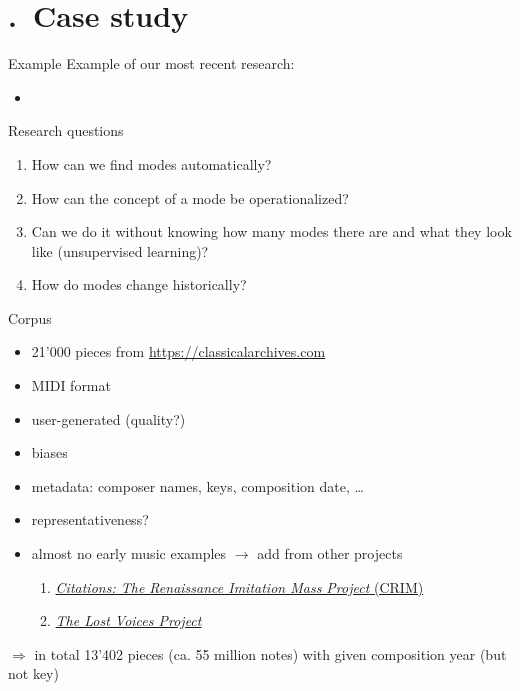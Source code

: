 \section{\thesection.~Case study}

\begin{frame}{Example}
    Example of our most recent research:
    \begin{itemize}
        \item {}
    \end{itemize}
\end{frame}

\begin{frame}{Research questions}
    \begin{enumerate}
        \item How can we find modes \alert{automatically}? 
        \item How can the concept of a \alert{mode} be operationalized? 
        \item Can we do it without knowing how many modes there are and what they look like (\alert{unsupervised learning})?
        \item How do modes change \alert{historically}?
    \end{enumerate}
\end{frame}

\begin{frame}{Corpus}
    \begin{itemize}
        \item 21'000 pieces from \url{https://classicalarchives.com}
        \item MIDI format
        \item user-generated (quality?)
        \item biases
        \item metadata: composer names, keys, composition date, \ldots 
        \item representativeness?
        \item almost no early music examples $\longrightarrow$ add from other projects
        \begin{enumerate}
            \item \href{http://crimproject.org/}{\emph{Citations: The Renaissance Imitation Mass Project} (CRIM)}
            \item \href{http://digitalduchemin.org/}{\emph{The Lost Voices Project}}
        \end{enumerate}
    \end{itemize}
    \pause
    $\Longrightarrow$ in total 13'402 pieces (ca. 55 million notes) with given composition year (but not key)
\end{frame}

